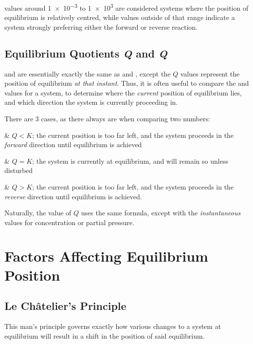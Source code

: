 			\Kc values around \num{1e-3} to \num{1e3} are considered systems where the position of equilibrium is relatively centred,
			while values outside of that range indicate a system strongly preferring either the forward or reverse reaction.



		\subsection{Equilibrium Quotients \textit{Q} and \textit{Q}}

			\Qc and \Qp are essentially exactly the same as \Kc and \Kp, except the $Q$ values represent the position of equilibrium
			\textit{at that instant}. Thus, it is often useful to compare the \Qc and \Kc values for a system, to determine
			where the \textit{current} position of equilibrium lies, and which direction the system is currently proceeding in.

			There are 3 cases, as there always are when comparing two numbers:

			\begin{bulletlist}
				& $Q < K$; the current position is too far left, and the system proceeds in the \textit{forward} direction until equilibrium
				is achieved

				& $Q = K$; the system is currently at equilibrium, and will remain so unless disturbed

				& $Q > K$; the current position is too far left, and the system proceeds in the \textit{reverse} direction until equilibrium
				is achieved.
			\end{bulletlist}

			Naturally, the value of $Q$ uses the same formula, except with the \textit{instantaneous} values for concentration or partial
			pressure.





	\pagebreak
	\section{Factors Affecting Equilibrium Position}

		\subsection{Le Châtelier's Principle}

			This man's principle governs exactly how various changes to a system at equilibrium will result in a shift in the position of
			said equilibrium.

